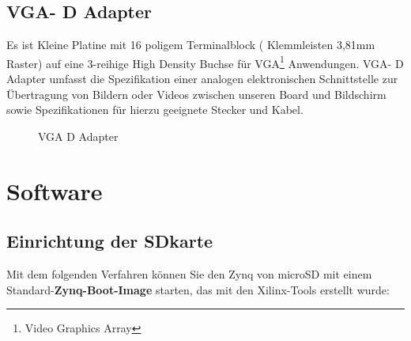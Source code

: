 \documentclass[a4paper]{report}
\begin{document}
\section{VGA- D Adapter}
Es ist Kleine Platine mit 16 poligem Terminalblock ( Klemmleisten 3,81mm Raster) auf eine 3-reihige High Density Buchse für VGA\footnote{Video Graphics Array} Anwendungen.
VGA- D Adapter umfasst die Spezifikation einer analogen elektronischen Schnittstelle zur Übertragung von Bildern oder Videos zwischen unseren Board und Bildschirm sowie Spezifikationen für hierzu geeignete Stecker und Kabel.


		\begin{figure}[H]
			\centering
			\qquad
			\caption{VGA D Adapter}
			\label{fig:VGA_Adapter}
		\end{figure}





\chapter{Software}

	
\section{Einrichtung der SDkarte}
\label{Einrichtung_der_SDkarte}


Mit dem folgenden Verfahren können Sie den Zynq von microSD mit einem Standard-\textbf{Zynq-Boot-Image} starten, das mit den Xilinx-Tools erstellt wurde:
\end{document}
